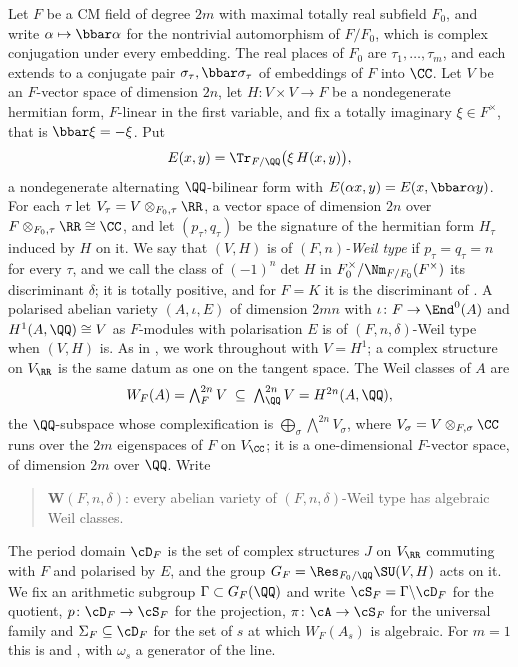 \begin{setupenv}\label{setup:cmfield}
Let $F$ be a CM field of degree $2m$ with maximal totally real subfield
$F_{0}$, and write $\alpha\mapsto\bbar\alpha$ for the nontrivial automorphism
of $F/F_{0}$, which is complex conjugation under every embedding. The real
places of $F_{0}$ are $\tau_{1},\dots,\tau_{m}$, and each extends to a
conjugate pair $\sigma_{\tau},\bbar\sigma_{\tau}$ of embeddings of $F$ into
$\CC$. Let $V$ be an $F$-vector space of dimension $2n$, let
$H\colon V\times V\to F$ be a nondegenerate hermitian form, $F$-linear in the
first variable, and fix a totally imaginary $\xi\in F^{\times}$, that is
$\bbar\xi=-\xi$. Put
\[
  E(x,y)=\Tr_{F/\QQ}\bigl(\xi\,H(x,y)\bigr),
\]
a nondegenerate alternating $\QQ$-bilinear form with
$E(\alpha x,y)=E(x,\bbar\alpha y)$. For each $\tau$ let
$V_{\tau}=V\otimes_{F_{0},\tau}\RR$, a vector space of dimension $2n$ over
$F\otimes_{F_{0},\tau}\RR\cong\CC$, and let $(p_{\tau},q_{\tau})$ be the
signature of the hermitian form $H_{\tau}$ induced by $H$ on it. We say that
$(V,H)$ is of \emph{$(F,n)$-Weil type} if $p_{\tau}=q_{\tau}=n$ for every
$\tau$, and we call the class of $(-1)^{n}\det H$ in
$F_{0}^{\times}/\Nm_{F/F_{0}}(F^{\times})$ its discriminant $\delta$; it is
totally positive, and for $F=K$ it is the discriminant of . A
polarised abelian variety $(A,\iota,E)$ of dimension $2mn$ with
$\iota\colon F\to\End^{0}(A)$ and $H^{1}(A,\QQ)\cong V$ as $F$-modules with
polarisation $E$ is of $(F,n,\delta)$-Weil type when $(V,H)$ is. As in
, we work throughout with $V=H^{1}$; a complex structure on
$V_{\RR}$ is the same datum as one on the tangent space. The Weil
classes of $A$ are
\[
  W_{F}(A)=\textstyle\bigwedge^{2n}_{F}V\;\subseteq\;\bigwedge^{2n}_{\QQ}V
  =H^{2n}(A,\QQ),
\]
the $\QQ$-subspace whose complexification is
$\bigoplus_{\sigma}\bigwedge^{2n}V_{\sigma}$, where $V_{\sigma}=V\otimes_{F,\sigma}\CC$
runs over the $2m$ eigenspaces of $F$ on $V_{\CC}$; it is a one-dimensional
$F$-vector space, of dimension $2m$ over $\QQ$. Write
\begin{quote}
$\mathbf{W}(F,n,\delta)$: every abelian variety of $(F,n,\delta)$-Weil type
has algebraic Weil classes.
\end{quote}
The period domain $\cD_{F}$ is the set of complex structures $J$ on
$V_{\RR}$ commuting with $F$ and polarised by $E$, and the group
$G_{F}=\Res_{F_{0}/\QQ}\SU(V,H)$ acts on it. We fix an arithmetic subgroup
$\Gamma\subset G_{F}(\QQ)$ and write $\cS_{F}=\Gamma\backslash\cD_{F}$ for the
quotient, $p\colon\cD_{F}\to\cS_{F}$ for the projection,
$\pi\colon\cA\to\cS_{F}$ for the universal family and
$\Sigma_{F}\subseteq\cD_{F}$ for the set of $s$ at which $W_{F}(A_{s})$ is
algebraic. For $m=1$ this is  and ,
with $\omega_{s}$ a generator of the line.
\end{setupenv}

